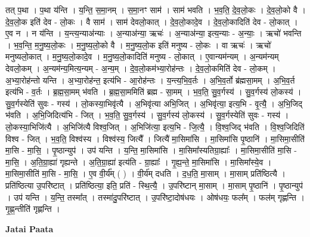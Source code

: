 \documentclass[17pt]{extarticle}
\begin{document}
तत् प॒था । प॒था य॑न्ति । य॒न्ति॒ स॒मा॒नम् । स॒मा॒नꣳ साम॑ । साम॑ भवति । भ॒व॒ति॒ दे॒व॒लो॒कः । दे॒व॒लो॒को वै । दे॒व॒लो॒क इति॑ देव - लो॒कः । वै साम॑ । साम॑ देवलो॒कात् । दे॒व॒लो॒कादे॒व । दे॒व॒लो॒कादिति॑ देव - लो॒कात् । ए॒व न । न य॑न्ति । य॒न्त्य॒न्याअ॑न्याः । अ॒न्याअ॑न्या॒ ऋचः॑ । अ॒न्याअ॑न्या॒ इत्य॒न्याः - अ॒न्याः॒ । ऋचो॑ भवन्ति । भ॒व॒न्ति॒ म॒नु॒ष्य॒लो॒कः । म॒नु॒ष्य॒लो॒को वै । म॒नु॒ष्य॒लो॒क इति॑ मनुष्य - लो॒कः । वा ऋचः॑ । ऋचो॑ मनुष्यलो॒कात् । म॒नु॒ष्य॒लो॒कादे॒व । म॒नु॒ष्य॒लो॒कादिति॑ मनुष्य - लो॒कात् । ए॒वान्यम॑न्यम् । अ॒न्यम॑न्यम् देवलो॒कम् । अ॒न्यम॑न्य॒मित्य॒न्यम् - अ॒न्य॒म् । दे॒व॒लो॒कम॑भ्या॒रोह॑न्तः । दे॒व॒लो॒कमिति॑ देव - लो॒कम् । अ॒भ्या॒रोह॑न्तो यन्ति । अ॒भ्या॒रोह॑न्त॒ इत्य॑भि - आ॒रोह॑न्तः । य॒न्त्य॒भि॒व॒र्तः । अ॒भि॒व॒र्तो ब्र॑ह्मसा॒मम् । अ॒भि॒व॒र्त इत्य॑भि - व॒र्तः । ब्र॒ह्म॒सा॒मम् भ॑वति । ब्र॒ह्म॒सा॒ममिति॑ ब्रह्म - सा॒मम् । भ॒व॒ति॒ सु॒व॒र्गस्य॑ । सु॒व॒र्गस्य॑ लो॒कस्य॑ । सु॒व॒र्गस्येति॑ सुवः - गस्य॑ । लो॒कस्या॒भिवृ॑त्यै । अ॒भिवृ॑त्या अभि॒जित् । अ॒भिवृ॑त्या॒ इत्य॒भि - वृ॒त्यै॒ । अ॒भि॒जिद् भ॑वति । अ॒भि॒जिदित्य॑भि - जित् । भ॒व॒ति॒ सु॒व॒र्गस्य॑ । सु॒व॒र्गस्य॑ लो॒कस्य॑ । सु॒व॒र्गस्येति॑ सुवः - गस्य॑ । लो॒कस्या॒भिजि॑त्यै । अ॒भिजि॑त्यै विश्व॒जित् । अ॒भिजि॑त्या॒ इत्य॒भि - जि॒त्यै॒ । वि॒श्व॒जिद् भ॑वति । वि॒श्व॒जिदिति॑ विश्व - जित् । भ॒व॒ति॒ विश्व॑स्य । विश्व॑स्य॒ जित्यै᳚ । जित्यै॑ मा॒सिमा॑सि । मा॒सिमा॑सि पृ॒ष्ठानि॑ । मा॒सिमा॒सीति॑ मा॒सि - मा॒सि॒ । पृ॒ष्ठान्युप॑ । उप॑ यन्ति । य॒न्ति॒ मा॒सिमा॑सि । मा॒सिमा᳚स्यतिग्रा॒ह्याः᳚ । मा॒सिमा॒सीति॑ मा॒सि - मा॒सि॒ । अ॒ति॒ग्रा॒ह्या॑ गृह्यन्ते । अ॒ति॒ग्रा॒ह्या॑ इत्य॑ति - ग्रा॒ह्याः᳚ । गृ॒ह्य॒न्ते॒ मा॒सिमा॑सि । मा॒सिमा᳚स्ये॒व । मा॒सिमा॒सीति॑ मा॒सि - मा॒सि॒ । ए॒व वी॒र्य᳚म् ( ) । वी॒र्य॑म् दधति । द॒ध॒ति॒ मा॒साम् । मा॒साम् प्रति॑ष्ठित्यै । प्रति॑ष्ठित्या उ॒परि॑ष्टात् । प्रति॑ष्ठित्या॒ इति॒ प्रति॑ - स्थि॒त्यै॒ । उ॒परि॑ष्टान् मा॒साम् । मा॒साम् पृ॒ष्ठानि॑ । पृ॒ष्ठान्युप॑ । उप॑ यन्ति । य॒न्ति॒ तस्मा᳚त् । तस्मा॑दु॒परि॑ष्टात् । उ॒परि॑ष्टा॒दोष॑धयः । ओष॑धयः॒ फल᳚म् । फल॑म् गृह्णन्ति । गृ॒ह्ण॒न्तीति॑ गृह्णन्ति । \newline

\textbf{Jatai Paata} \newline
\end{document}
